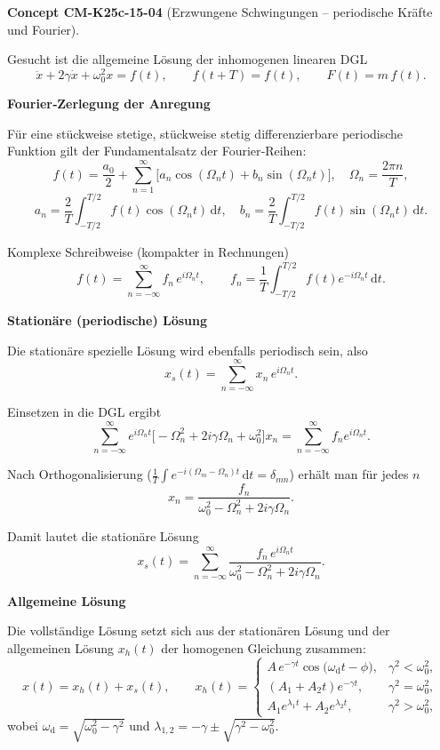 \documentclass[10pt, letterpaper]{article}
\newcommand{\CustomHeading}[3]{%
  \par\medskip\noindent%
  \textbf{#1 #2} \textnormal{(#3)}.\enskip%
}
\newenvironment{CONC}[2]{\CustomHeading{Concept}{#1}{#2}}{}
\begin{document}
\begin{CONC}{CM-K25c-15-04}{Erzwungene Schwingungen – periodische Kräfte und Fourier}
Gesucht ist die allgemeine Lösung der inhomogenen linearen DGL
\[
  \ddot{x}+2\gamma\dot{x}+\omega_{0}^{2}x=f(t),
  \qquad
  f(t+T)=f(t),
  \qquad
  F(t)=m\,f(t).
\]

\textbf{Fourier‐Zerlegung der Anregung}

Für eine stückweise stetige, stückweise stetig differenzierbare
periodische Funktion gilt der Fundamentalsatz der Fourier‐Reihen:
\[
  f(t)=\frac{a_{0}}{2}
       +\sum_{n=1}^{\infty}\!
          \bigl[a_{n}\cos(\Omega_{n}t)+b_{n}\sin(\Omega_{n}t)\bigr],
  \quad
  \Omega_{n}=\frac{2\pi n}{T},
\]
\[
  a_{n}=\frac{2}{T}\!\!\int_{-T/2}^{T/2}\!f(t)\cos(\Omega_{n}t)\,\mathrm dt,
  \quad
  b_{n}=\frac{2}{T}\!\!\int_{-T/2}^{T/2}\!f(t)\sin(\Omega_{n}t)\,\mathrm dt.
\]

Komplexe Schreibweise (kompakter in Rechnungen)
\[
  f(t)=\sum_{n=-\infty}^{\infty}f_{n}\,e^{i\Omega_{n}t},
  \qquad
  f_{n}=\frac{1}{T}\!\!\int_{-T/2}^{T/2}\!f(t)e^{-i\Omega_{n}t}\,\mathrm dt .
\]

\textbf{Stationäre (periodische) Lösung}

Die stationäre spezielle Lösung wird ebenfalls periodisch sein, also
\[
  x_{s}(t)=\sum_{n=-\infty}^{\infty}x_{n}\,e^{i\Omega_{n}t}.
\]

Einsetzen in die DGL ergibt
\[
  \sum_{n=-\infty}^{\infty}
    e^{i\Omega_{n}t}\!
    \bigl[-\Omega_{n}^{2}+2i\gamma\Omega_{n}+\omega_{0}^{2}\bigr]x_{n}
  =\sum_{n=-\infty}^{\infty}f_{n}e^{i\Omega_{n}t}.
\]

Nach Orthogonalisierung (\(\tfrac1T\int e^{-i(\Omega_{m}-\Omega_{n})t}\,\mathrm dt=\delta_{mn}\))
erhält man für jedes $n$
\[
  x_{n}=\frac{f_{n}}
              {\omega_{0}^{2}-\Omega_{n}^{2}+2i\gamma\Omega_{n}} .
\]

Damit lautet die stationäre Lösung
\[
  x_{s}(t)=
    \sum_{n=-\infty}^{\infty}
      \frac{f_{n}\,e^{i\Omega_{n}t}}
           {\omega_{0}^{2}-\Omega_{n}^{2}+2i\gamma\Omega_{n}} .
\]

\textbf{Allgemeine Lösung}

Die vollständige Lösung setzt sich aus der stationären Lösung und der
allgemeinen Lösung \(x_{h}(t)\) der homogenen Gleichung zusammen:
\[
  x(t)=x_{h}(t)+x_{s}(t),
  \qquad
  x_{h}(t)=
  \begin{cases}
    A\,e^{-\gamma t}\cos\bigl(\omega_{\mathrm d}t-\phi\bigr),
    &\gamma^{2}<\omega_{0}^{2},\\[6pt]
    (A_{1}+A_{2}t)e^{-\gamma t},
    &\gamma^{2}=\omega_{0}^{2},\\[6pt]
    A_{1}e^{\lambda_{1}t}+A_{2}e^{\lambda_{2}t},
    &\gamma^{2}>\omega_{0}^{2},
  \end{cases}
\]
wobei
\(\omega_{\mathrm d}=\sqrt{\omega_{0}^{2}-\gamma^{2}}\) und
\(\lambda_{1,2}=-\gamma\pm\sqrt{\gamma^{2}-\omega_{0}^{2}}\).


\end{CONC}
\end{document}
